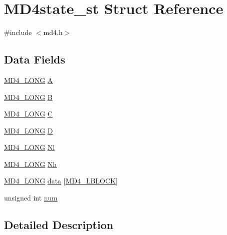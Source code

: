 \hypertarget{struct_m_d4state__st}{}\section{M\+D4state\+\_\+st Struct Reference}
\label{struct_m_d4state__st}


{\ttfamily \#include $<$md4.\+h$>$}

\subsection*{Data Fields}
\begin{DoxyCompactItemize}
\item 
\hyperlink{include_2openssl_2md4_8h_ad1088f1ba76d4b0e1ac5b25152319e89}{M\+D4\+\_\+\+L\+O\+NG} \hyperlink{struct_m_d4state__st_a744a1250e435f8b6aea1133e890b51b7}{A}
\item 
\hyperlink{include_2openssl_2md4_8h_ad1088f1ba76d4b0e1ac5b25152319e89}{M\+D4\+\_\+\+L\+O\+NG} \hyperlink{struct_m_d4state__st_a2ef246032ce4a2405bd607335b17a9bf}{B}
\item 
\hyperlink{include_2openssl_2md4_8h_ad1088f1ba76d4b0e1ac5b25152319e89}{M\+D4\+\_\+\+L\+O\+NG} \hyperlink{struct_m_d4state__st_a45f02db51d7c709d8e825354986ff94b}{C}
\item 
\hyperlink{include_2openssl_2md4_8h_ad1088f1ba76d4b0e1ac5b25152319e89}{M\+D4\+\_\+\+L\+O\+NG} \hyperlink{struct_m_d4state__st_a322ed02e1749a687524d3f872f008a8b}{D}
\item 
\hyperlink{include_2openssl_2md4_8h_ad1088f1ba76d4b0e1ac5b25152319e89}{M\+D4\+\_\+\+L\+O\+NG} \hyperlink{struct_m_d4state__st_ae83bdcbca9d2e71c53489dbfd7f95b1d}{Nl}
\item 
\hyperlink{include_2openssl_2md4_8h_ad1088f1ba76d4b0e1ac5b25152319e89}{M\+D4\+\_\+\+L\+O\+NG} \hyperlink{struct_m_d4state__st_a04e4541af84005182d038332d2f9320f}{Nh}
\item 
\hyperlink{include_2openssl_2md4_8h_ad1088f1ba76d4b0e1ac5b25152319e89}{M\+D4\+\_\+\+L\+O\+NG} \hyperlink{struct_m_d4state__st_a5c46fe77de65b3e4102bf31ad378b8df}{data} \mbox{[}\hyperlink{include_2openssl_2md4_8h_a355848ebbfb1946058a9de73968a62e9}{M\+D4\+\_\+\+L\+B\+L\+O\+CK}\mbox{]}
\item 
unsigned int \hyperlink{struct_m_d4state__st_a41ddefd3473727cad32a9767c10faed8}{num}
\end{DoxyCompactItemize}


\subsection{Detailed Description}


